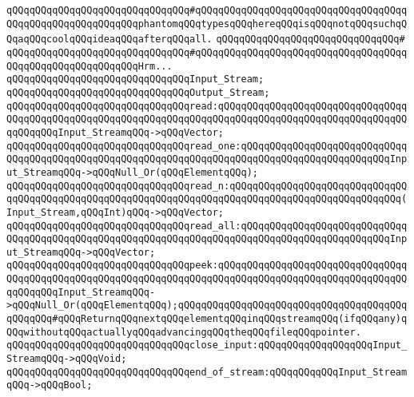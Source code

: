\verb|qQQqqQQqqQQqqQQqqQQqqQQqqQQqqQQq#qQQqqQQqqQQqqQQqqQQqqQQqqQQqqQQqqQQqqQQqqQQqqQQqqQQqqQQqqQQqphantomqQQqtypesqQQqhereqQQqisqQQqnotqQQqsuchqQQqaqQQqcoolqQQqideaqQQqafterqQQqall.|\newline
\verb|qQQqqQQqqQQqqQQqqQQqqQQqqQQqqQQq#|\newline
\verb|qQQqqQQqqQQqqQQqqQQqqQQqqQQqqQQq#qQQqqQQqqQQqqQQqqQQqqQQqqQQqqQQqqQQqqQQqqQQqqQQqqQQqqQQqqQQqHrm...|\newline
\newline
\verb|qQQqqQQqqQQqqQQqqQQqqQQqqQQqqQQqInput_Stream;|\newline
\verb|qQQqqQQqqQQqqQQqqQQqqQQqqQQqqQQqOutput_Stream;|\newline
\newline
\verb|qQQqqQQqqQQqqQQqqQQqqQQqqQQqqQQqread:qQQqqQQqqQQqqQQqqQQqqQQqqQQqqQQqqQQqqQQqqQQqqQQqqQQqqQQqqQQqqQQqqQQqqQQqqQQqqQQqqQQqqQQqqQQqqQQqqQQqqQQqqQQqqQQqInput_StreamqQQq->qQQqVector;|\newline
\verb|qQQqqQQqqQQqqQQqqQQqqQQqqQQqqQQqread_one:qQQqqQQqqQQqqQQqqQQqqQQqqQQqqQQqqQQqqQQqqQQqqQQqqQQqqQQqqQQqqQQqqQQqqQQqqQQqqQQqqQQqqQQqqQQqqQQqInput_StreamqQQq->qQQqNull_Or(qQQqElementqQQq);|\newline
\newline
\verb|qQQqqQQqqQQqqQQqqQQqqQQqqQQqqQQqread_n:qQQqqQQqqQQqqQQqqQQqqQQqqQQqqQQqqQQqqQQqqQQqqQQqqQQqqQQqqQQqqQQqqQQqqQQqqQQqqQQqqQQqqQQqqQQqqQQqqQQq(Input_Stream,qQQqInt)qQQq->qQQqVector;|\newline
\verb|qQQqqQQqqQQqqQQqqQQqqQQqqQQqqQQqread_all:qQQqqQQqqQQqqQQqqQQqqQQqqQQqqQQqqQQqqQQqqQQqqQQqqQQqqQQqqQQqqQQqqQQqqQQqqQQqqQQqqQQqqQQqqQQqqQQqInput_StreamqQQq->qQQqVector;|\newline
\newline
\verb|qQQqqQQqqQQqqQQqqQQqqQQqqQQqqQQqpeek:qQQqqQQqqQQqqQQqqQQqqQQqqQQqqQQqqQQqqQQqqQQqqQQqqQQqqQQqqQQqqQQqqQQqqQQqqQQqqQQqqQQqqQQqqQQqqQQqqQQqqQQqqQQqqQQqInput_StreamqQQq->qQQqNull_Or(qQQqElementqQQq);qQQqqQQqqQQqqQQqqQQqqQQqqQQqqQQqqQQqqQQqqQQqqQQq#qQQqReturnqQQqnextqQQqelementqQQqinqQQqstreamqQQq(ifqQQqany)qQQqwithoutqQQqactuallyqQQqadvancingqQQqtheqQQqfileqQQqpointer.|\newline
\newline
\verb|qQQqqQQqqQQqqQQqqQQqqQQqqQQqqQQqclose_input:qQQqqQQqqQQqqQQqqQQqInput_StreamqQQq->qQQqVoid;|\newline
\verb|qQQqqQQqqQQqqQQqqQQqqQQqqQQqqQQqend_of_stream:qQQqqQQqqQQqInput_StreamqQQq->qQQqBool;|\newline
\newline

